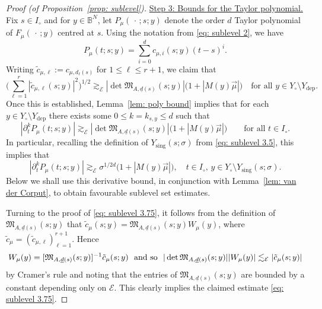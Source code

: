 \documentclass[reqno]{amsart}
\numberwithin{equation}{section}
\newcommand{\B}{\mathbb{B}}
\newcommand{\cE}{\mathcal{E}}
\newcommand{\sE}{\mathscr{E}}
\newcommand{\fM}{\mathfrak{M}}
\theoremstyle{plain}
\theoremstyle{definition}
\begin{document}
\begin{proof}[Proof (of Proposition~\ref{prop: sublevel})]



\noindent \underline{Step 3: Bounds for the Taylor polynomial.} Fix $s \in I_{\circ}$ and for $y \in \B^N$, let $P_{\mu}(\,\cdot\,;s;y)$ denote the order $d$ Taylor polynomial of $F_{\mu}(\,\cdot\,;y)$ centred at $s$. Using the notation from \eqref{eq: sublevel 2}, we have
\begin{equation*}
    P_{\mu}(t;s;y) = \sum_{i=0}^d c_{\mu,i}(s;y) (t-s)^i.
\end{equation*}
Writing $\tilde{c}_{\mu,\ell} := c_{\mu, d_\ell(s)}$ for $1 \leq \ell \leq r+1$, we claim that  
\begin{equation}\label{eq: sublevel 3.75}
\big(\sum_{\ell=1}^r|\tilde{c}_{\mu,\ell}(s; y)|^2 \big)^{1/2} \gtrsim_{\sE} |\det \fM_{A,{\underline{d}}(s)}(s; y)|\big( 1 + |M(y)\vec{\mu}|\big) \quad \textrm{for all $y \in Y_{\circ} \setminus Y_{\mathrm{dep}}$.}
\end{equation}
Once this is established, Lemma~\ref{lem: poly bound} implies that for each $y \in Y_{\circ}\setminus Y_{\mathrm{dep}}$ there exists some $0 \leq k = k_{s,y} \leq d$ such that 
\begin{equation*}
    |\partial_t^k P_{\mu}(t;s;y)| \gtrsim_{\sE} |\det \fM_{A,{\underline{d}}(s)}(s;y)|\big( 1 + |M(y)\vec{\mu}|\big) \qquad \textrm{for all $t \in I_{\circ}$.}
\end{equation*}
In particular, recalling the definition of $Y_{\mathrm{sing}}(s;\sigma)$ from \eqref{eq: sublevel 3.5}, this implies that
\begin{equation}\label{eq: sublevel 4}
    |\partial_t^k P_{\mu}(t;s;y)| \gtrsim_{\sE} \sigma^{1/2d} \big( 1 + |M(y)\vec{\mu}|\big), \quad t \in I_{\circ},\, y \in Y_{\circ} \setminus  Y_{\mathrm{sing}}(s;\sigma). 
\end{equation}
Below we shall use this derivative bound, in conjunction with Lemma~\ref{lem: van der Corput}, to obtain favourable sublevel set estimates. 

Turning to the proof of \eqref{eq: sublevel 3.75}, it follows from the definition of $\fM_{A,{\underline{d}}(s)}(s;y)$ that $\tilde{c}_{\mu}(s;y) = \fM_{A,{\underline{d}}(s)}(s;y) W_{\mu}(y)$, where $\tilde{c}_{\mu} = (\tilde{c}_{\mu,\ell})_{\ell = 1}^{r+1}$. Hence 
\begin{equation*}
  W_{\mu}(y) =  [\fM_{A,{\underline{d}}(s)}(s;y)]^{-1} \tilde{c}_{\mu}(s;y)
\ \  {\rm and \ so} \ \
|\det \fM_{A,{\underline{d}}(s)}(s;y)||W_{\mu}(y)|  \lesssim_{\cE}  
|\tilde{c}_{\mu}(s;y)|   
\end{equation*}
by Cramer's rule and noting that the entries of $\fM_{A,{\underline{d}}(s)}(s;y)$ are bounded by a constant depending only on $\cE$. This clearly implies the claimed estimate \eqref{eq: sublevel 3.75}.
\medskip


\end{proof}
\end{document}
